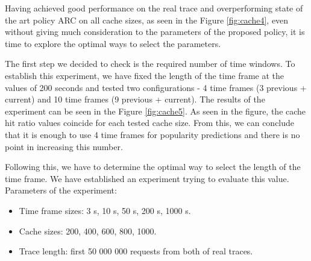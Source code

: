 Having achieved good performance on the real trace and overperforming state of the art policy ARC on all cache sizes, as seen in the Figure \ref{fig:cache4}, even without giving much consideration to the parameters of the proposed policy, it is time to explore the optimal ways to select the parameters.

The first step we decided to check is the required number of time windows. To establish this experiment, we have fixed the length of the time frame at the values of 200 seconds and tested two configurations - 4 time frames (3 previous + current) and 10 time frames (9 previous + current). The results of the experiment can be seen in the Figure \ref{fig:cache5}. As seen in the figure, the cache hit ratio values coincide for each tested cache size. From this, we can conclude that it is enough to use 4 time frames for popularity predictions and there is no point in increasing this number.

Following this, we have to determine the optimal way to select the length of the time frame. We have established an experiment trying to evaluate this value. Parameters of the experiment:

\begin{itemize}
	\item Time frame sizes: 3 s, 10 s, 50 s, 200 s, 1000 s.
	\item Cache sizes: 200, 400, 600, 800, 1000.
	\item Trace length: first 50 000 000 requests from both of real traces.
\end{itemize}

